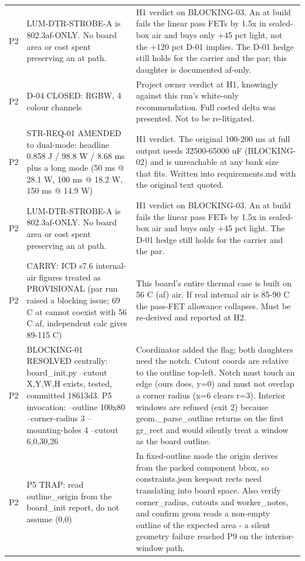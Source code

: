 \documentclass[11pt,a4paper]{article}
\begin{document}
{\begin{longtable}{lp{5.2cm}p{7.2cm}}
P2 & LUM-DTR-STROBE-A is 802.3af-ONLY. No board area or cost spent preserving an at path. & H1 verdict on BLOCKING-03. An at build fails the linear pass FETs by 1.5x in sealed-box air and buys only +45 pct light, not the +120 pct D-01 implies. The D-01 hedge still holds for the carrier and the par; this daughter is documented af-only. \\
P2 & D-04 CLOSED: RGBW, 4 colour channels & Project owner verdict at H1, knowingly against this run's white-only recommendation. Full costed delta was presented. Not to be re-litigated. \\
P2 & STR-REQ-01 AMENDED to dual-mode: headline 0.858 J / 98.8 W / 8.68 ms plus a long mode (50 ms @ 28.1 W, 100 ms @ 18.2 W, 150 ms @ 14.9 W) & H1 verdict. The original 100-200 ms at full output needs 32500-65000 uF (BLOCKING-02) and is unreachable at any bank size that fits. Written into requirements.md with the original text quoted. \\
P2 & LUM-DTR-STROBE-A is 802.3af-ONLY. No board area or cost spent preserving an at path. & H1 verdict on BLOCKING-03. An at build fails the linear pass FETs by 1.5x in sealed-box air and buys only +45 pct light. The D-01 hedge still holds for the carrier and the par. \\
P2 & CARRY: ICD s7.6 internal-air figures treated as PROVISIONAL (par run raised a blocking issue; 69 C at cannot coexist with 56 C af, independent calc gives 89-115 C) & This board's entire thermal case is built on 56 C (af) air. If real internal air is 85-90 C the pass-FET allowance collapses. Must be re-derived and reported at H2. \\
P2 & BLOCKING-01 RESOLVED centrally: board\_init.py --cutout X,Y,W,H exists, tested, committed 18613d3. P5 invocation: --outline 100x80 --corner-radius 3 --mounting-holes 4 --cutout 6,0,30,26 & Coordinator added the flag; both daughters need the notch. Cutout coords are relative to the outline top-left. Notch must touch an edge (ours does, y=0) and must not overlap a corner radius (x=6 clears r=3). Interior windows are refused (exit 2) because geom.\_parse\_outline returns on the first gr\_rect and would silently treat a window as the board outline. \\
P2 & P5 TRAP: read outline\_origin from the board\_init report, do not assume (0,0) & In fixed-outline mode the origin derives from the packed component bbox, so constraints.json keepout rects need translating into board space. Also verify corner\_radius, cutouts and worker\_notes, and confirm geom reads a non-empty outline of the expected area - a silent geometry failure reached P9 on the interior-window path. \\

\end{longtable}}
\end{document}
